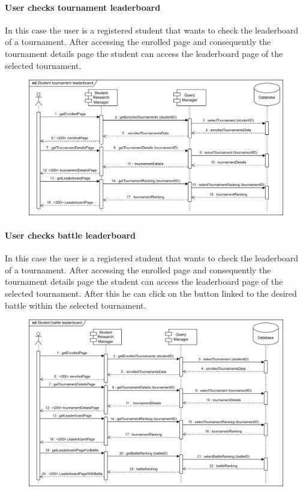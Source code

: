 \documentclass[12pt, a4paper]{report}
\begin{document}
    \paragraph*{User checks tournament leaderboard}
    In this case the user is a registered student that wants to check the leaderboard of a tournament. 
    After accessing the enrolled page and consequently the tournament details page the student can access the leaderboard page of the selected tournament. 
    \begin{figure}[H]
        \centering
        \includegraphics[width=1.0\linewidth]{images/stlrv.png}
    \end{figure}

    \paragraph*{User checks battle leaderboard}
    In this case the user is a registered student that wants to check the leaderboard of a tournament. 
    After accessing the enrolled page and consequently the tournament details page the student can access the leaderboard page of the selected tournament. 
    After this he can click on the button linked to the desired battle within the selected tournament. 
    \begin{figure}[H]
        \centering
        \includegraphics[width=1.0\linewidth]{images/sblrv.png}
    \end{figure}
\end{document}
